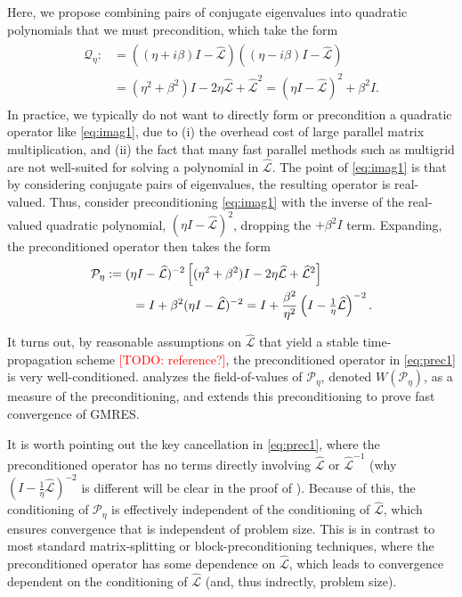 \documentclass[review]{siamart}
\makeatletter
\newcommand{\todo}[1]{\textcolor{red}{[TODO\@: #1]}}
\makeatother
\begin{document}
Here, we propose combining pairs of conjugate eigenvalues into quadratic polynomials
that we must precondition, which take the form 
%
\begin{align}\label{eq:imag1}
\begin{split}
\mathcal{Q}_\eta :&= ((\eta + i\beta)I - \widehat{\mathcal{L}})((\eta - i\beta)I - \widehat{\mathcal{L}}) \\
& = (\eta^2+\beta^2)I - 2\eta \widehat{\mathcal{L}} + \widehat{\mathcal{L}}^2 
= (\eta I - \widehat{\mathcal{L}})^2 + \beta^2I. 
\end{split}
\end{align}
%
In practice, we typically do not want to directly form or precondition a quadratic
operator like \eqref{eq:imag1}, due to (i) the overhead cost of large parallel matrix
multiplication, and (ii) the fact that many fast parallel methods such as multigrid are not well-suited for solving a polynomial in $\widehat{\mathcal{L}}$. The point of \eqref{eq:imag1}
is that by considering conjugate pairs of eigenvalues, the resulting operator is real-valued.
Thus, consider preconditioning \eqref{eq:imag1} with the inverse of the real-valued quadratic
polynomial, $(\eta I - \widehat{\mathcal{L}})^2$, dropping the $+ \beta^2 I$ term. Expanding,
the preconditioned operator then takes the form
%
\begin{align}\nonumber
\mathcal{P}_\eta & := (\eta I - \widehat{\mathcal{L}})^{-2}\left[(\eta^2+\beta^2)I - 2\eta \widehat{\mathcal{L}} + \widehat{\mathcal{L}}^2\right] \\
&\hspace{5ex} = I + \beta^2(\eta I - \widehat{\mathcal{L}})^{-2}
= I + \frac{\beta^2}{\eta^2}\left(I - \tfrac{1}{\eta}\widehat{\mathcal{L}}\right)^{-2}.\label{eq:prec1}
\end{align}
%

It turns out, by reasonable assumptions on $\widehat{\mathcal{L}}$ that yield a stable
time-propagation scheme \todo{reference?}, the preconditioned operator in \eqref{eq:prec1}
is very well-conditioned.   analyzes the field-of-values of $\mathcal{P}_\eta$,
denoted $W(\mathcal{P}_\eta)$, as a measure of the preconditioning, and  extends
this preconditioning to prove fast convergence of GMRES. 

%
\begin{remark}
It is worth pointing out the key
cancellation in \eqref{eq:prec1}, where the preconditioned operator has no terms directly
involving $\widehat{\mathcal{L}}$ or $\widehat{\mathcal{L}}^{-1}$ (why $(I -
\tfrac{1}{\eta}\widehat{\mathcal{L}})^{-2}$ is different will be clear in the proof
of ). Because of this, the conditioning of $\mathcal{P}_\eta$ is effectively
independent of the conditioning of $\widehat{\mathcal{L}}$, which ensures convergence
that is independent of problem size. This is in contrast to most standard matrix-splitting
or block-preconditioning techniques, where the preconditioned operator has some dependence
on $\widehat{\mathcal{L}}$, which leads to convergence dependent on the conditioning of
$\widehat{\mathcal{L}}$ (and, thus indrectly, problem size).
\end{remark}
%
\end{document}
